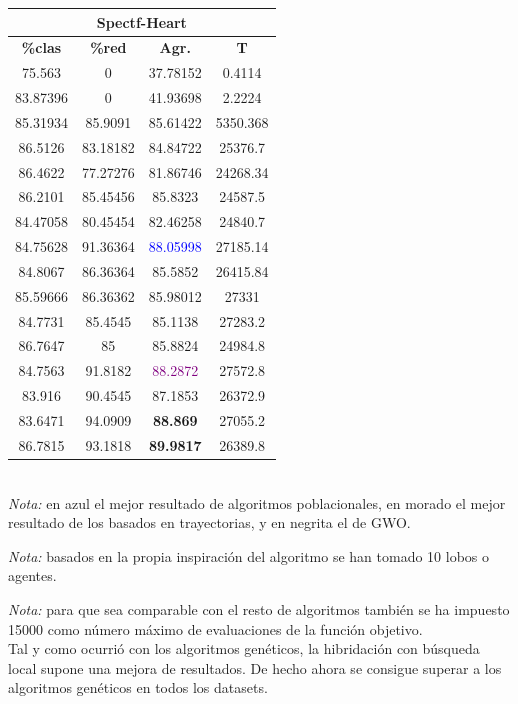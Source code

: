 \documentclass[11pt,a4paper]{article}
\theoremstyle{definition}
\begin{document}
\begin{tabbing}
{		\begin{tabular}{|c|c|c|c|}
			\hline
			\multicolumn{4}{|c|}{\textbf{Spectf-Heart}} \\ \hline
			\textbf{\%clas} & \textbf{\%red} & \textbf{Agr.} & \textbf{T} \\ \hline 
			75.563	  &0	      &37.78152	&0.4114\\ \hline
83.87396	&0	      &41.93698	&2.2224\\ \hline
85.31934	&85.9091	&85.61422	&5350.368\\ \hline
86.5126 & 83.18182 & 84.84722 & 25376.7\\ \hline
86.4622 & 77.27276 & 81.86746 & 24268.34\\ \hline
86.2101 & 85.45456 & 85.8323 & 24587.5\\ \hline
84.47058 & 80.45454 & 82.46258 & 24840.7\\ \hline
84.75628 & 91.36364 & \textcolor{blue}{88.05998} & 27185.14\\ \hline
84.8067 & 86.36364 & 85.5852 & 26415.84\\ \hline
85.59666 & 86.36362 & 85.98012 & 27331\\ \hline
84.7731 & 85.4545 & 85.1138 & 27283.2 \\ \hline
86.7647 & 85 & 85.8824 & 24984.8 \\ \hline
84.7563 & 91.8182 & \textcolor{purple}{88.2872} & 27572.8 \\ \hline
83.916 & 90.4545 & 87.1853 & 26372.9 \\ \hline
83.6471 & 94.0909 & \textbf{88.869} & 27055.2 \\ \hline
86.7815 & 93.1818 & \textbf{89.9817} & 26389.8 \\ \hline
		\end{tabular}
		}
	\end{tabbing}~\\
	
	\textit{Nota:} en azul el mejor resultado de algoritmos poblacionales, en morado el mejor resultado de los basados en trayectorias, y en negrita el de GWO. 
	
	\textit{Nota:} basados en la propia inspiración del algoritmo se han tomado 10 lobos o agentes.
	
	\textit{Nota:} para que sea comparable con el resto de algoritmos también se ha impuesto 15000 como número máximo de evaluaciones de la función objetivo.\\
	
	Tal y como ocurrió con los algoritmos genéticos, la hibridación con búsqueda local supone una mejora de resultados. De hecho ahora se consigue superar a los algoritmos genéticos en todos los datasets.
	
\end{document}
